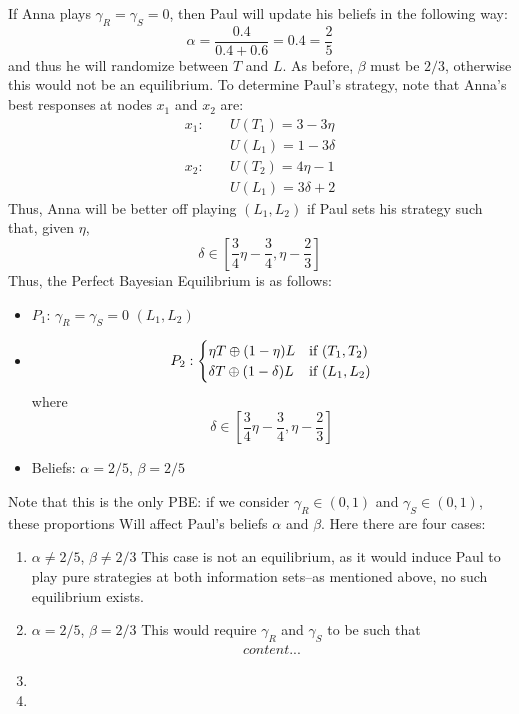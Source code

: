 \documentclass[11pt]{article}
\begin{document}
\begin{enumerate}
	If Anna plays $ \gamma_R  = \gamma_S = 0 $, then Paul will update his beliefs in the following way:
	\[\alpha = \frac{0.4}{0.4 + 0.6} = 0.4 = \frac{2}{5}\]
	and thus he will randomize between $ T $ and $ L $. As before, $\beta$ must be $ 2/3 $, otherwise this would not be an equilibrium. To determine Paul's strategy, note that Anna's best responses at nodes $ x_1 $ and $ x_2 $ are:
	\begin{align*}
	x_1: \quad & U(T_1) = 3 - 3\eta \\
	&U(L_1) = 1 - 3\delta \\
	x_2:\quad & U(T_2) = 4\eta - 1 \\
	& U(L_1) = 3\delta + 2
	\end{align*}
	Thus, Anna will be better off playing $ (L_1, L_2) $ if Paul sets his strategy such that, given $\eta$, 
	\[\delta\in[\frac{3}{4}\eta - \frac{3}{4}, \eta - \frac{2}{3}]\]
	Thus, the Perfect Bayesian Equilibrium is as follows: 
	\begin{itemize}
		\item $ P_1 $: $ \gamma_R = \gamma_S = 0 $ $ (L_1, L_2) $
		\item \[P_2: \begin{cases}
		\eta T \oplus (1 - \eta)L & \text{if $ (T_1, T_2) $} \\
		\delta T \oplus (1 - \delta) L & \text{if $ (L_1, L_2) $}
		\end{cases}\]
		where 
		\[\delta\in[\frac{3}{4}\eta - \frac{3}{4}, \eta - \frac{2}{3}]\]
		\item Beliefs: $\alpha = 2/5$, $ \beta = 2/5 $ 
	\end{itemize}

	Note that this is the only PBE: if we consider $ \gamma_R\in(0,1) $ and $ \gamma_S\in(0,1) $, these proportions Will affect Paul's beliefs $\alpha$ and $\beta$. Here there are four cases:
	\begin{enumerate}[label = (\arabic*)]
		\item $\alpha\neq 2/5$, $\beta\neq 2/3$ This case is not an equilibrium, as it would induce Paul to play pure strategies at both information sets--as mentioned above, no such equilibrium exists. 
		\item $\alpha = 2/5$, $\beta = 2/3$ This would require $\gamma_R$ and $\gamma_S$ to be such that 
		\begin{align*}
		content...
		\end{align*}
		\item 
		\item 
	\end{enumerate}
	

\end{enumerate}
\end{document}
